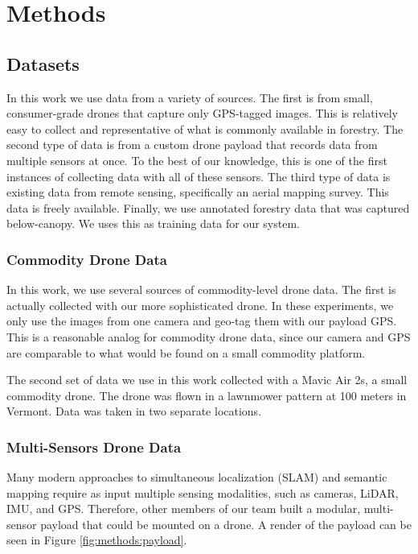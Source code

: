 \chapter{Methods} \label{chapMethod}
\section{Datasets}
In this work we use data from a variety of sources. The first is from small, consumer-grade drones that capture only GPS-tagged images. This is relatively easy to collect and representative of what is commonly available in forestry. The second type of data is from a custom drone payload that records data from multiple sensors at once. To the best of our knowledge, this is one of the first instances of collecting data with all of these sensors. The third type of data is existing data from remote sensing, specifically an aerial mapping survey. This data is freely available. Finally, we use annotated forestry data that was captured below-canopy. We uses this as training data for our system.

\subsection{Commodity Drone Data}


In this work, we use several sources of commodity-level drone data. The first is actually collected with our more sophisticated drone. In these experiments, we only use the images from one camera and geo-tag them with our payload GPS. This is a reasonable analog for commodity drone data, since our camera and GPS are comparable to what would be found on a small commodity platform. 

The second set of data we use in this work collected with a Mavic Air 2s, a small commodity drone. The drone was flown in a lawnmower pattern at 100 meters in Vermont. Data was taken in two separate locations. 

\subsection{Multi-Sensors Drone Data}
Many modern approaches to simultaneous localization (SLAM) and semantic mapping require as input multiple sensing modalities, such as cameras, LiDAR, IMU, and GPS. Therefore, other members of our team built a modular, multi-sensor payload that could be mounted on a drone. A render of the payload can be seen in Figure \ref{fig:methods:payload}. 

